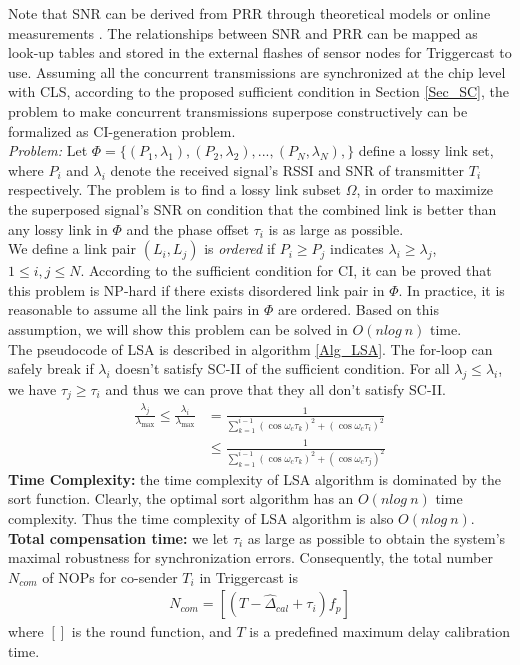 \documentclass[conference]{IEEEtran}
\begin{document}
\indent Note that SNR can be derived from PRR through theoretical models \cite{Yin2012SCIF} or online measurements \cite{Xing2010ICNPPassive}.
The relationships between SNR and PRR can be mapped as look-up tables and stored in the external flashes of sensor nodes for Triggercast to use. Assuming all the concurrent transmissions are synchronized at the chip level with CLS, according to the proposed sufficient condition in Section \ref{Sec_SC}, the problem to make concurrent transmissions superpose constructively can be formalized as CI-generation problem.\\
\indent \emph{Problem:} Let $\Phi = \{(P_1,\lambda_1),(P_2,\lambda_2),...,(P_N,\lambda_N),\}$ define a lossy link set, where $P_i$ and $\lambda_i$ denote the received signal's RSSI and SNR of transmitter $T_i$ respectively.
The problem is to find a lossy link subset $\Omega$, in order to maximize the superposed signal's SNR on condition that the combined link is better than any lossy link in $\Phi$ and the phase offset $\tau_i$ is as large as possible.\\\indent We define a link pair $(L_i, L_j)$ is \emph{ordered} if $P_i\geq P_j$ indicates $\lambda_i\geq \lambda_j$, $1 \leq i,j \leq N$.
According to the sufficient condition for CI, it can be proved that this problem is NP-hard if there exists disordered link pair in $\Phi$.
In practice, it is reasonable to assume all the link pairs in $\Phi$ are ordered.
Based on this assumption, we will show this problem can be solved in $O(nlog~n)$ time. \\
\indent The pseudocode of LSA is described in algorithm \ref{Alg_LSA}. The for-loop can safely break if $\lambda_i$ doesn't satisfy SC-II of the sufficient condition.
For all $\lambda_j \leq \lambda_i$, we have $\tau_j \geq \tau_i$ and thus we can prove that they all don't satisfy SC-II.
\begin{align}
\label{Equ_SafeBreak}
\frac{{\lambda _j }}{{\lambda _{\max } }} \le \frac{{\lambda _i }}{{\lambda _{\max } }} &= \frac{1}{{\sum\limits_{k = 1}^{i - 1} {(\cos \omega _c \tau _k )^2  + (\cos \omega _c \tau _i )^2 } }}\nonumber\\
&\le \frac{1}{{\sum\limits_{k = 1}^{i - 1} {(\cos \omega _c \tau _k )^2 }  + (\cos \omega _c \tau _j )^2 }}
\end{align}
\indent \textbf{Time Complexity:} the time complexity of LSA algorithm is dominated by the sort function.
Clearly, the optimal sort algorithm has an $O(nlog~n)$ time complexity.
Thus the time complexity of LSA algorithm is also $O(nlog~n)$.\\
\indent \textbf{Total compensation time:} we let $\tau _i$ as large as possible to obtain the system's maximal robustness for synchronization errors. Consequently, the total number $N_{com}$ of NOPs for co-sender $T_i$ in Triggercast is
\begin{align}
\label{Equ_CompensationNop}
N_{com}=\left[ {(T - \widehat\Delta _{cal}  + \tau _i )f_p } \right]
\end{align}
where $[]$ is the round function, and $T$ is a predefined maximum delay calibration time.
\end{document}
